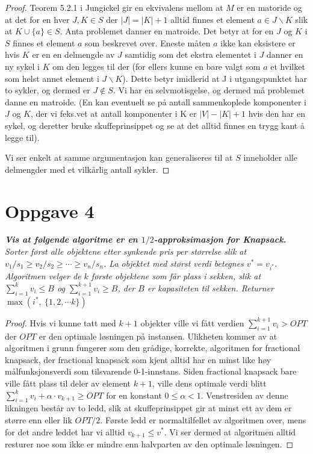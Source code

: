 \documentclass[12pt]{article}
\begin{document}
\begin{proof}
Teorem 5.2.1 i Jungickel gir en ekvivalens mellom at $M$ er en matoride og at det for en hver $J, K \in S$ der $|J| = |K|+1$ alltid finnes et element $a \in J \backslash K$ slik at $K \cup \{a\} \in S$. Anta problemet danner en matroide. Det betyr at for en $J$ og $K$ i $S$ finnes et element $a$ som beskrevet over. Eneste måten $a$ ikke kan eksistere er hvis $K$ er en en delmengde av $J$ samtidig som det ekstra elementet i $J$ danner en ny sykel i $K$ om den legges til der (for ellers kunne en bare valgt som $a$ et hvilket som helst annet element i $J \backslash K$). Dette betyr imidlerid at J i utgangspunktet har to sykler, og dermed er $J \not\in S$. Vi har en selvmotisgelse, og dermed må problemet danne en matroide. (En kan eventuelt se på antall sammenkoplede komponenter i $J$ og $K$, der vi feks.vet at antall komponenter i K er $|V|-|K|+1$ hvis den har en sykel, og deretter bruke skuffeprinsippet og se at det alltid finnes en trygg kant å legge til).

Vi ser enkelt at samme argumentasjon kan generaliseres til at $S$ inneholder alle delmengder med et vilkårlig antall sykler.
\end{proof}


\section{Oppgave 4}
\it{\textbf{Vis at følgende algoritme er en $1/2$-approksimasjon for Knapsack.}}
Sorter først alle objektene etter synkende pris per størrelse slik at $v_1/s_1 \geq v_2/s_2 \geq \cdots \geq v_n/s_n$. La objektet med størst verdi betegnes $v^* = v_{i^*}$. Algoritmen velger de $k$ første objektene som får plass i sekken, slik at $\sum_{i=1}^{k}v_i \leq B$ og $\sum_{i=1}^{k+1} v_i \geq B$, der $B$ er kapasiteten til sekken. Returner $\max \left(i^{*}, ~ \{1, 2, \cdots k\} \right)$
\begin{proof}
Hvis vi kunne tatt med $k+1$ objekter ville vi fått verdien $\sum_{i=1}^{k+1} v_i > OPT$ der $OPT$ er den optimale løsningen på instansen. Ulikheten kommer av at algoritmen i grunn fungerer som den grådige, korrekte, algoritmen for fractional knapsack, der fractional knapsack som kjent alltid har en minst like høy målfunksjonsverdi som tilsvarende 0-1-innstans. Siden fractional knapsack bare ville fått plass til deler av element $k+1$, ville dens optimale verdi blitt $\sum_{i=1}^{k} v_i + \alpha \cdot v_{k+1} \geq OPT$ for en konstant $0 \leq \alpha < 1$. Venstresiden av denne likningen består av to ledd, slik at skuffeprinsippet gir at minst ett av dem er større enn eller lik $OPT/2$. Første ledd er normaltilfellet av algoritmen over, mens for det andre leddet har vi alltid $v_{k+1} \leq v^*$. Vi ser dermed at algoritmen alltid resturer noe som ikke er mindre enn halvparten av den optimale løsningen.
\end{proof}
\end{document}
